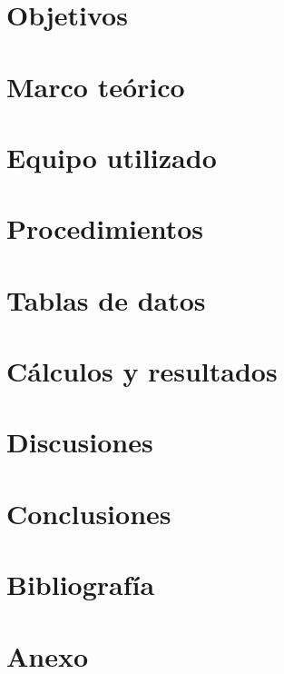 \documentclass[12pt, a4paper]{article}
\begin{document}


\pagestyle{fancy}
\fancyfoot{} %
\fancyfoot[R]{\thepage}

\tableofcontents
\clearpage

\section{Objetivos}


\section{Marco teórico}


\section{Equipo utilizado}


\section{Procedimientos}


\section{Tablas de datos}


\section{Cálculos y resultados}


\section{Discusiones}


\section{Conclusiones}


\section{Bibliografía}
\printbibliography[heading=none]

\clearpage

\listoffigures
\listoftables

\clearpage

\section{Anexo}

\end{document}
